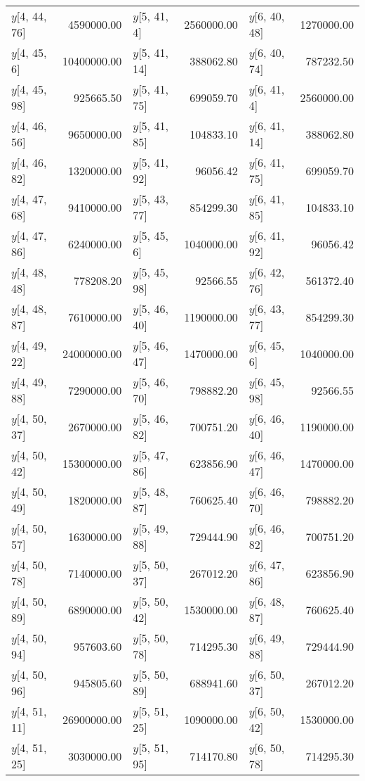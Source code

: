 \begin{longtable}{lrlrlr}
$y$[4, 44, 76] & 4590000.00 & $y$[5, 41, 4] & 2560000.00 & $y$[6, 40, 48] & 1270000.00 \\
$y$[4, 45, 6] & 10400000.00 & $y$[5, 41, 14] & 388062.80 & $y$[6, 40, 74] & 787232.50 \\
$y$[4, 45, 98] & 925665.50 & $y$[5, 41, 75] & 699059.70 & $y$[6, 41, 4] & 2560000.00 \\
$y$[4, 46, 56] & 9650000.00 & $y$[5, 41, 85] & 104833.10 & $y$[6, 41, 14] & 388062.80 \\
$y$[4, 46, 82] & 1320000.00 & $y$[5, 41, 92] & 96056.42 & $y$[6, 41, 75] & 699059.70 \\
$y$[4, 47, 68] & 9410000.00 & $y$[5, 43, 77] & 854299.30 & $y$[6, 41, 85] & 104833.10 \\
$y$[4, 47, 86] & 6240000.00 & $y$[5, 45, 6] & 1040000.00 & $y$[6, 41, 92] & 96056.42 \\
$y$[4, 48, 48] & 778208.20 & $y$[5, 45, 98] & 92566.55 & $y$[6, 42, 76] & 561372.40 \\
$y$[4, 48, 87] & 7610000.00 & $y$[5, 46, 40] & 1190000.00 & $y$[6, 43, 77] & 854299.30 \\
$y$[4, 49, 22] & 24000000.00 & $y$[5, 46, 47] & 1470000.00 & $y$[6, 45, 6] & 1040000.00 \\
$y$[4, 49, 88] & 7290000.00 & $y$[5, 46, 70] & 798882.20 & $y$[6, 45, 98] & 92566.55 \\
$y$[4, 50, 37] & 2670000.00 & $y$[5, 46, 82] & 700751.20 & $y$[6, 46, 40] & 1190000.00 \\
$y$[4, 50, 42] & 15300000.00 & $y$[5, 47, 86] & 623856.90 & $y$[6, 46, 47] & 1470000.00 \\
$y$[4, 50, 49] & 1820000.00 & $y$[5, 48, 87] & 760625.40 & $y$[6, 46, 70] & 798882.20 \\
$y$[4, 50, 57] & 1630000.00 & $y$[5, 49, 88] & 729444.90 & $y$[6, 46, 82] & 700751.20 \\
$y$[4, 50, 78] & 7140000.00 & $y$[5, 50, 37] & 267012.20 & $y$[6, 47, 86] & 623856.90 \\
$y$[4, 50, 89] & 6890000.00 & $y$[5, 50, 42] & 1530000.00 & $y$[6, 48, 87] & 760625.40 \\
$y$[4, 50, 94] & 957603.60 & $y$[5, 50, 78] & 714295.30 & $y$[6, 49, 88] & 729444.90 \\
$y$[4, 50, 96] & 945805.60 & $y$[5, 50, 89] & 688941.60 & $y$[6, 50, 37] & 267012.20 \\
$y$[4, 51, 11] & 26900000.00 & $y$[5, 51, 25] & 1090000.00 & $y$[6, 50, 42] & 1530000.00 \\
$y$[4, 51, 25] & 3030000.00 & $y$[5, 51, 95] & 714170.80 & $y$[6, 50, 78] & 714295.30 \\

\end{longtable}
